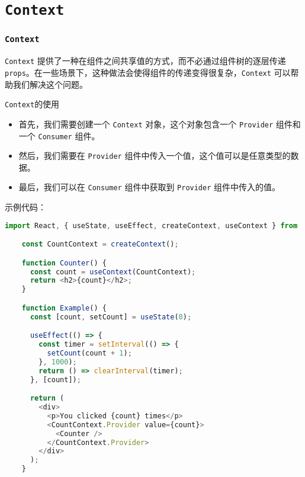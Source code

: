\documentclass{beamer}
\begin{document}
\section{\texttt{Context}}

\begin{frame}
  \frametitle{\texttt{Context}}

  \texttt{Context} 提供了一种在组件之间共享值的方式，而不必通过组件树的逐层传递 \texttt{props}。在一些场景下，这种做法会使得组件的传递变得很复杂，\texttt{Context} 可以帮助我们解决这个问题。

  \framebreak

  \begin{block}{\texttt{Context}的使用}
    \begin{itemize}
      \item 首先，我们需要创建一个 \texttt{Context} 对象，这个对象包含一个 \texttt{Provider} 组件和一个 \texttt{Consumer} 组件。
      \item 然后，我们需要在 \texttt{Provider} 组件中传入一个值，这个值可以是任意类型的数据。
      \item 最后，我们可以在 \texttt{Consumer} 组件中获取到 \texttt{Provider} 组件中传入的值。
    \end{itemize}
  \end{block}

  \framebreak

  示例代码：
  \begin{lstlisting}[language=JavaScript]
    import React, { useState, useEffect, createContext, useContext } from 'react';

    const CountContext = createContext();

    function Counter() {
      const count = useContext(CountContext);
      return <h2>{count}</h2>;
    }

    function Example() {
      const [count, setCount] = useState(0);

      useEffect(() => {
        const timer = setInterval(() => {
          setCount(count + 1);
        }, 1000);
        return () => clearInterval(timer);
      }, [count]);

      return (
        <div>
          <p>You clicked {count} times</p>
          <CountContext.Provider value={count}>
            <Counter />
          </CountContext.Provider>
        </div>
      );
    }
  \end{lstlisting}

\end{frame}
\end{document}
